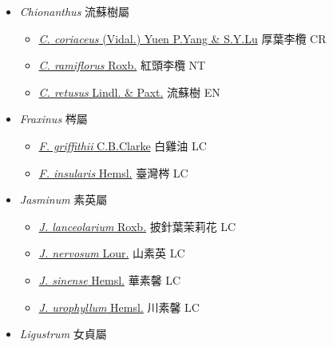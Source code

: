 
  \begin{itemize}
 \item[] \textit{Chionanthus} 流蘇樹屬
                    
  \begin{itemize}
        \item[] \href{http://www.theplantlist.org/tpl1.1/search?q=Chionanthus+coriaceus}{\textit{C. coriaceus} (Vidal.) Yuen P.Yang \& S.Y.Lu}   厚葉李欖 CR
        \item[] \href{http://www.theplantlist.org/tpl1.1/search?q=Chionanthus+ramiflorus}{\textit{C. ramiflorus} Roxb.}   紅頭李欖 NT
        \item[] \href{http://www.theplantlist.org/tpl1.1/search?q=Chionanthus+retusus}{\textit{C. retusus} Lindl. \& Paxt.}   流蘇樹 EN
  \end{itemize}
 \item[] \textit{Fraxinus} 梣屬
                    
  \begin{itemize}
        \item[] \href{http://www.theplantlist.org/tpl1.1/search?q=Fraxinus+griffithii}{\textit{F. griffithii} C.B.Clarke}   白雞油 LC
        \item[] \href{http://www.theplantlist.org/tpl1.1/search?q=Fraxinus+insularis}{\textit{F. insularis} Hemsl.}   臺灣梣 LC
  \end{itemize}
 \item[] \textit{Jasminum} 素英屬
                    
  \begin{itemize}
        \item[] \href{http://www.theplantlist.org/tpl1.1/search?q=Jasminum+lanceolarium}{\textit{J. lanceolarium} Roxb.}   披針葉茉莉花 LC
        \item[] \href{http://www.theplantlist.org/tpl1.1/search?q=Jasminum+nervosum}{\textit{J. nervosum} Lour.}   山素英 LC
        \item[] \href{http://www.theplantlist.org/tpl1.1/search?q=Jasminum+sinense}{\textit{J. sinense} Hemsl.}   華素馨 LC
        \item[] \href{http://www.theplantlist.org/tpl1.1/search?q=Jasminum+urophyllum}{\textit{J. urophyllum} Hemsl.}   川素馨 LC
  \end{itemize}
 \item[] \textit{Ligustrum} 女貞屬
                    

\end{itemize}
